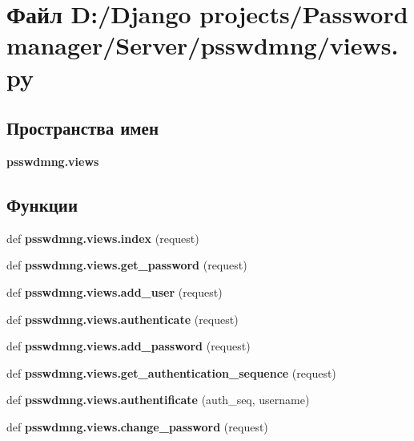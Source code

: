 \section{Файл D\+:/\+Django projects/\+Password manager/\+Server/psswdmng/views.py}
\label{views_8py}
\subsection*{Пространства имен}
\begin{DoxyCompactItemize}
\item 
 \textbf{ psswdmng.\+views}
\end{DoxyCompactItemize}
\subsection*{Функции}
\begin{DoxyCompactItemize}
\item 
def \textbf{ psswdmng.\+views.\+index} (request)
\item 
def \textbf{ psswdmng.\+views.\+get\+\_\+password} (request)
\item 
def \textbf{ psswdmng.\+views.\+add\+\_\+user} (request)
\item 
def \textbf{ psswdmng.\+views.\+authenticate} (request)
\item 
def \textbf{ psswdmng.\+views.\+add\+\_\+password} (request)
\item 
def \textbf{ psswdmng.\+views.\+get\+\_\+authentication\+\_\+sequence} (request)
\item 
def \textbf{ psswdmng.\+views.\+authentificate} (auth\+\_\+seq, username)
\item 
def \textbf{ psswdmng.\+views.\+change\+\_\+password} (request)
\end{DoxyCompactItemize}
